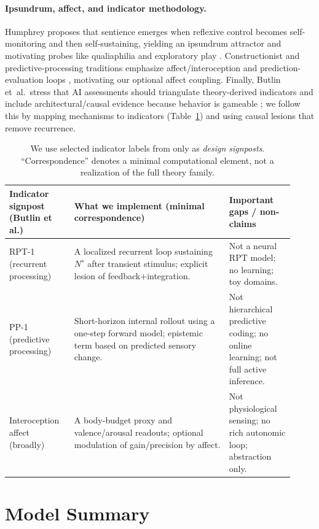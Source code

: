 \documentclass[letterpaper]{article} %
\begin{document}
\paragraph{Ipsundrum, affect, and indicator methodology.}
Humphrey proposes that sentience emerges when reflexive control becomes self-monitoring and then self-sustaining, yielding an ipsundrum attractor and motivating probes like qualiaphilia and exploratory play \citep{Humphrey2023Sentience}.
Constructionist and predictive-processing traditions emphasize affect/interoception and prediction-evaluation loops \citep{Barrett2017HowEmotions,Friston2010FreeEnergy,WolpertEtAl1995InternalModel}, motivating our optional affect coupling.
Finally, Butlin et~al.\ stress that AI assessments should triangulate theory-derived indicators and include architectural/causal evidence because behavior is gameable \citep{ButlinEtAl2025Indicators}; we follow this by mapping mechanisms to indicators (Table~\ref{tab:butlin_coverage}) and using causal lesions that remove recurrence.
\begin{table}[t]
\centering
\scriptsize
\begin{tabular}{@{}p{0.21\linewidth}p{0.50\linewidth}p{0.21\linewidth}@{}}
\toprule
Indicator signpost (Butlin et al.) & What we implement (minimal correspondence) & Important gaps / non-claims \\
\midrule
RPT-1 (recurrent processing) & A localized recurrent loop sustaining $N^s$ after transient stimulus; explicit lesion of feedback+integration. & Not a neural RPT model; no learning; toy domains. \\
PP-1 (predictive processing) & Short-horizon internal rollout using a one-step forward model; epistemic term based on predicted sensory change. & Not hierarchical predictive coding; no online learning; not full active inference. \\
Interoception affect (broadly) & A body-budget proxy and valence/arousal readouts; optional modulation of gain/precision by affect. & Not physiological sensing; no rich autonomic loop; abstraction only. \\
\bottomrule
\end{tabular}
\caption{We use selected indicator labels from \citet{ButlinEtAl2025Indicators} only as \emph{design signposts}. ``Correspondence'' denotes a minimal computational element, not a realization of the full theory family.}
\label{tab:butlin_coverage}
\end{table}

\section{Model Summary}
\end{document}

